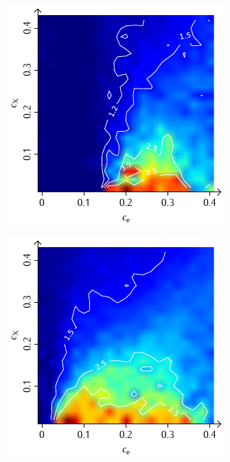 \documentclass[a4paper, 10pt, twoside, openany]{book} %
\begin{document}
	\begin{figure}
		\begin{minipage}[t]{0.48\textwidth}
			\includegraphics[width=\textwidth]{Abbildungen/Phasendiagramme/Konturen/H_cluster_D.pdf}
			\label{H_cluster_D}
		\end{minipage}
		\hfill
		\begin{minipage}[t]{0.48\textwidth}
			\includegraphics[width=\textwidth]{Abbildungen/Phasendiagramme/Konturen/H_penalty_cluster_D.pdf}

\end{minipage}
\end{figure}
\end{document}
